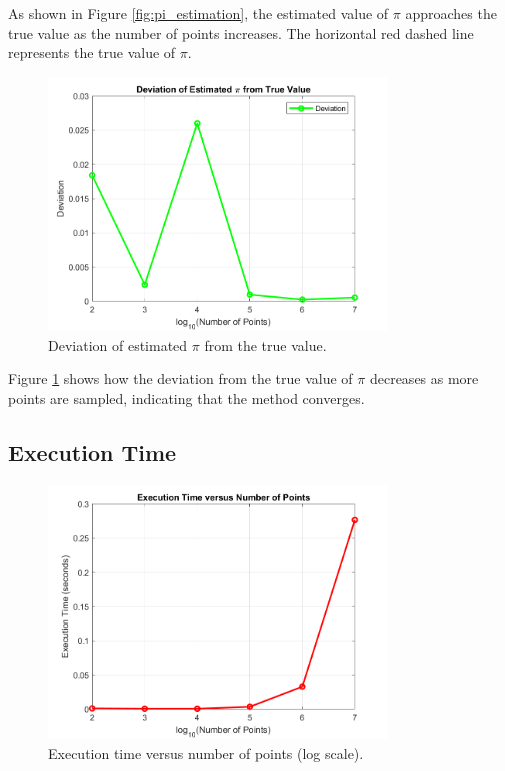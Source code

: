 \documentclass{article}
\begin{document}
As shown in Figure \ref{fig:pi_estimation}, the estimated value of $\pi$ approaches the true value as the number of points increases. The horizontal red dashed line represents the true value of $\pi$.

\begin{figure}[h!]
    \centering
    \includegraphics[width=0.8\textwidth]{pi_deviation_plot.png}
    \caption{Deviation of estimated $\pi$ from the true value.}
    \label{fig:pi_deviation}
\end{figure}

Figure \ref{fig:pi_deviation} shows how the deviation from the true value of $\pi$ decreases as more points are sampled, indicating that the method converges.

\subsection{Execution Time}
\begin{figure}[h!]
    \centering
    \includegraphics[width=0.8\textwidth]{execution_time_plot.png}
    \caption{Execution time versus number of points (log scale).}
    \label{fig:execution_time}
\end{figure}
\end{document}
